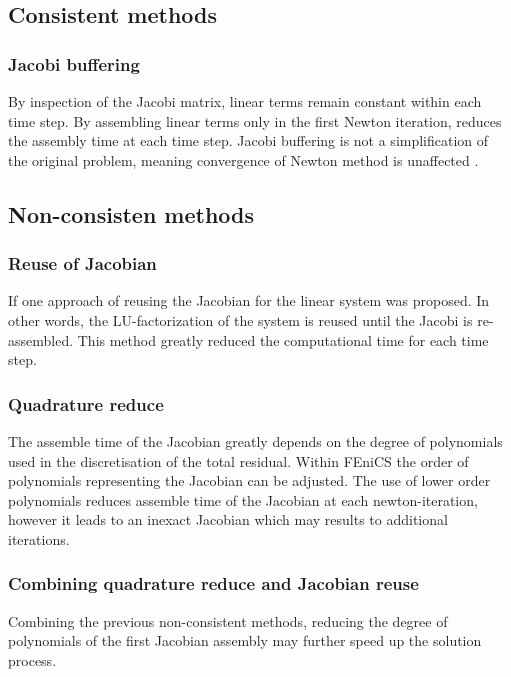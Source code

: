 \subsection{Consistent methods}
\subsubsection{Jacobi buffering}
By inspection of the Jacobi matrix, linear terms remain constant within each time step. By assembling linear terms only in the first Newton iteration, reduces the assembly time at each time step. Jacobi buffering is not a simplification of the original problem, meaning convergence of Newton method is unaffected .  

\subsection{Non-consisten methods}    
\subsubsection{Reuse of Jacobian}
 If  one approach of reusing the Jacobian for the linear system was proposed. In other words, the LU-factorization of the system is reused until the Jacobi is re-assembled. This method greatly reduced the computational time for each time step. 

\subsubsection{Quadrature reduce}
The assemble time of the Jacobian greatly depends on the degree of polynomials used in the discretisation of the total residual. Within FEniCS the order of polynomials representing the Jacobian can be adjusted. The use of lower order polynomials reduces assemble time of the Jacobian at each newton-iteration, however it leads to an inexact Jacobian which may results to additional iterations. 

\subsubsection{Combining quadrature reduce and Jacobian reuse}
Combining the previous non-consistent methods, reducing the degree of polynomials of the first Jacobian assembly may further speed up the solution process. 


